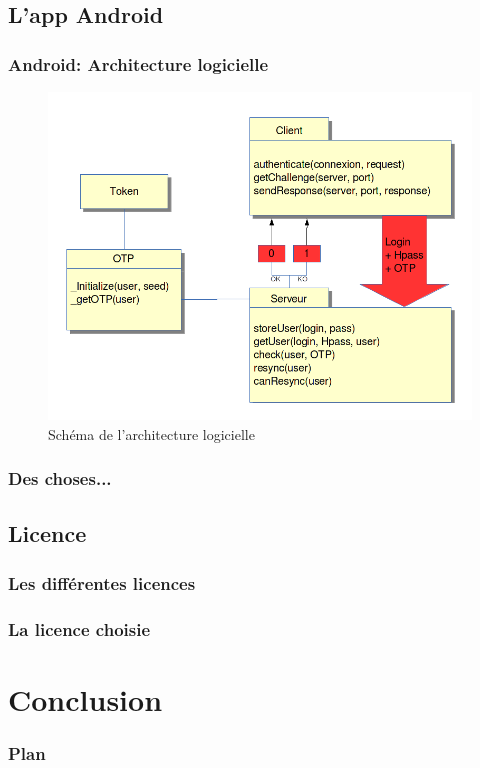 \documentclass[xcolor=table]{beamer}
\begin{document}
\subsection{L'app Android}
\begin{frame}
\frametitle{Android: Architecture logicielle}
\begin{figure}
 \includegraphics[scale=0.3]{../graphics/architecture.png} 
 \caption{Schéma de l'architecture logicielle}
\end{figure}

\end{frame}

\begin{frame}
\frametitle{Des choses...}
\end{frame}

\subsection{Licence}
\begin{frame}
\frametitle{Les différentes licences}

\end{frame}

\begin{frame}
\frametitle{La licence choisie}

\end{frame}

\section{Conclusion}
\begin{frame}  
\frametitle{Plan} 
\end{frame}
\end{document}
